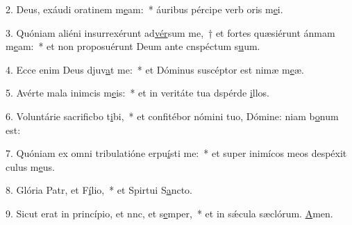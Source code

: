 2. Deus, exáudi oratinem m\uline{e}am:~* áuribus pércipe verb oris m\uline{e}i.\par 
3. Quóniam aliéni insurrexérunt ad\uline{vér}sum me,~† et fortes quæsiérunt ánmam m\uline{e}am:~* et non proposuérunt Deum ante cnspéctum s\uline{u}um.\par 
4. Ecce enim Deus djuv\uline{a}t me:~* et Dóminus suscéptor est nimæ m\uline{e}æ.\par 
5. Avérte mala inimcis m\uline{e}is:~* et in veritáte tua dspérde \uline{i}llos.\par 
6. Voluntárie sacrificbo t\uline{i}bi,~* et confitébor nómini tuo, Dómine: niam b\uline{o}num est:\par 
7. Quóniam ex omni tribulatióne erpu\uline{í}sti me:~* et super inimícos meos despéxit culus m\uline{e}us.\par 
8. Glória Patr, et F\uline{í}lio,~* et Spirtui S\uline{a}ncto.\par 
9. Sicut erat in princípio, et nnc, et s\uline{e}mper,~* et in sǽcula sæclórum. \uline{A}men.\par 

